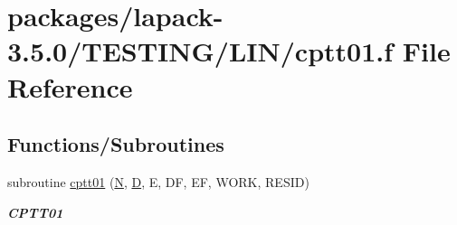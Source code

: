 \hypertarget{cptt01_8f}{}\section{packages/lapack-\/3.5.0/\+T\+E\+S\+T\+I\+N\+G/\+L\+I\+N/cptt01.f File Reference}
\label{cptt01_8f}
\subsection*{Functions/\+Subroutines}
\begin{DoxyCompactItemize}
\item 
subroutine \hyperlink{group__complex__lin_gaebcf52acf0a749939e8b49fb0e854f52}{cptt01} (\hyperlink{polmisc_8c_a0240ac851181b84ac374872dc5434ee4}{N}, \hyperlink{odrpack_8h_a7dae6ea403d00f3687f24a874e67d139}{D}, E, D\+F, E\+F, W\+O\+R\+K, R\+E\+S\+I\+D)
\begin{DoxyCompactList}\small\item\em {\bfseries C\+P\+T\+T01} \end{DoxyCompactList}\end{DoxyCompactItemize}
